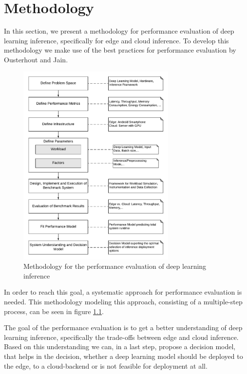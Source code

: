 \chapter{Methodology}
\label{chap:methodology}

In this section, we present a methodology for performance evaluation of deep learning inference, specifically for edge and cloud inference.
To develop this methodology we make use of the best practices for performance evaluation by Ousterhout \cite{Ousterhout:2018:AMO:3234519.3213770} and Jain\cite{books/daglib/0076234}.


\begin{figure}[!htb]
\centering
\includegraphics[width=0.7\textwidth]{./Bilder/Methodology.pdf}
\caption{Methodology for the performance evaluation of deep learning inference}
\label{fig:Methodology}
\end{figure}
In order to reach this goal, a systematic approach for performance evaluation is needed.
This methodology modeling this approach, consisting of a multiple-step process, can be seen in figure \ref{fig:Methodology}. 


The goal of the performance evaluation is to get a better understanding of deep learning inference, specifically the trade-offs between edge and cloud inference.
Based on this understanding we can, in a last step, propose a decision model, that helps in the decision, whether a deep learning model should be deployed to the edge, to a cloud-backend or is not feasible for deployment at all.


